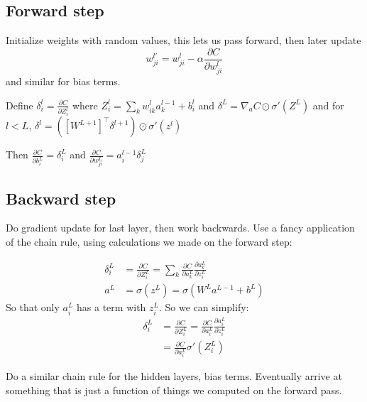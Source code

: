 \documentclass{article}
\begin{document}
\subsection{Forward step}
Initialize weights with random values, this lets us pass forward, then later update
\begin{equation*}
  w_{ji}^{l'}=w_{ji}^l - \alpha \frac{\partial C}{\partial{w_{ji}^l}}
\end{equation*}
and similar for bias terms.

Define $\delta_i^l=\frac{\partial C}{\partial Z_i^l}$ where $Z_i^l=\sum_k w_{ik}^l a^{l-1}_k+b_i^l$
and $\delta^L=\nabla_a C\odot \sigma'(Z^L)$ and for $l<L$, $\delta^l=\left( \left[ W^{L+1} \right]^\top \delta^{l+1} \right) \odot \sigma'(z^l)$

Then $\frac{\partial C}{\partial b_i^L} = \delta_i^L$ and $\frac{\partial C}{\partial w_{ji}^L} = a_i^{l-1}\delta_j^L$

\subsection{Backward step}
Do gradient update for last layer, then work backwards. Use a fancy application of the chain rule, using
calculations we made on the forward step:

\begin{align*}
  \delta_i^L&=\frac{\partial C}{\partial Z_i^L}=\sum_k \frac{\partial C}{\partial a_k^L} \frac{\partial a_k^L}{\partial z_i^L}
  \\
  a^L&=\sigma(z^L)=\sigma(W^L a^{L-1} + b^L)
\end{align*}
So that only $a_i^L$ has a term with $z_i^L$.
So we can simplify:
\begin{align*}
  \delta_i^L&=\frac{\partial C}{\partial Z_i^L}=\frac{\partial C}{\partial a_i^L} \frac{\partial a_i^L}{\partial z_i^L}
  \\
  &= \frac{\partial C}{\partial a_i^L} \sigma'(Z_i^L)
\end{align*}

Do a similar chain rule for the hidden layers, bias terms. Eventually arrive at something that is just a function of
things we computed on the forward pass.

\end{document}
